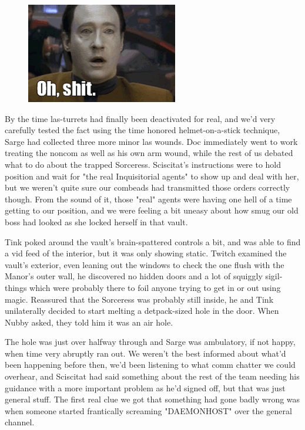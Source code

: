 \begin{figure}
	\begin{center}
		\includegraphics[width=\figwidth]{pics/18/65.png}
	\end{center}
\end{figure}
By the time las-turrets had finally been deactivated for real, and we'd very carefully tested the fact using the time honored helmet-on-a-stick technique, Sarge had collected three more minor las wounds. 
Doc immediately went to work treating the noncom as well as his own arm wound, while the rest of us debated what to do about the trapped Sorceress. 
Sciscitat's instructions were to hold position and wait for "the real Inquisitorial agents" to show up and deal with her, but we weren't quite sure our combeads had transmitted those orders correctly though. 
From the sound of it, those "real" agents were having one hell of a time getting to our position, and we were feeling a bit uneasy about how smug our old boss had looked as she locked herself in that vault. 


Tink poked around the vault's brain-spattered controls a bit, and was able to find a vid feed of the interior, but it was only showing static. 
Twitch examined the vault's exterior, even leaning out the windows to check the one flush with the Manor's outer wall, he discovered no hidden doors and a lot of squiggly sigil-things which were probably there to foil anyone trying to get in or out using magic. 
Reassured that the Sorceress was probably still inside, he and Tink unilaterally decided to start melting a detpack-sized hole in the door. 
When Nubby asked, they told him it was an air hole.

The hole was just over halfway through and Sarge was ambulatory, if not happy, when time very abruptly ran out. 
We weren't the best informed about what'd been happening before then, we'd been listening to what comm chatter we could overhear, and Sciscitat had said something about the rest of the team needing his guidance with a more important problem as he'd signed off, but that was just general stuff. 
The first real clue we got that something had gone badly wrong was when someone started frantically screaming "DAEMONHOST" over the general channel.


